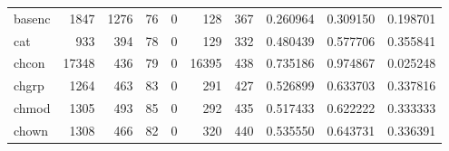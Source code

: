 \begin{tabular}{lrrrrrrrrr}
basenc    &                                1847 &                                            1276 &                                             76 &                                             0 &                                            128 &                                          367 &                                           0.260964 &                               0.309150 &                             0.198701 \\
cat       &                                 933 &                                             394 &                                             78 &                                             0 &                                            129 &                                          332 &                                           0.480439 &                               0.577706 &                             0.355841 \\
chcon     &                               17348 &                                             436 &                                             79 &                                             0 &                                          16395 &                                          438 &                                           0.735186 &                               0.974867 &                             0.025248 \\
chgrp     &                                1264 &                                             463 &                                             83 &                                             0 &                                            291 &                                          427 &                                           0.526899 &                               0.633703 &                             0.337816 \\
chmod     &                                1305 &                                             493 &                                             85 &                                             0 &                                            292 &                                          435 &                                           0.517433 &                               0.622222 &                             0.333333 \\
chown     &                                1308 &                                             466 &                                             82 &                                             0 &                                            320 &                                          440 &                                           0.535550 &                               0.643731 &                             0.336391 \\

\end{tabular}
